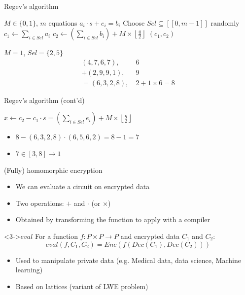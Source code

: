 \documentclass{beamer}
\providecommand{\floor}[1]{\left \lfloor #1 \right \rfloor }
\begin{document}
\begin{frame}{Regev's algorithm}
	\begin{algorithm}[H]
		\caption{Encryption}\label{algo:regev_enc}
		\begin{algorithmic}
			\Require $M\in\{0, 1\}$, $m$ equations $a_i \cdot s + e_i = b_i$
			\State Choose $Sel\subseteq[\![0, m-1]\!]$ randomly
			\State $c_1 \gets \displaystyle\sum_{i\in Sel} a_i$
			\State $c_2 \gets \left(\displaystyle\sum_{i\in Sel} b_i\right) + M \times \floor{\frac{q}{2}}$
			\State \Return $(c_1, c_2)$
		\end{algorithmic}
	\end{algorithm}
		$M = 1$, $Sel = \{2, 5\}$
		\begin{align*}
			(4, 7, 6, 7), &\ 6 \\
			+ (2, 9, 9, 1), &\ 9 \\
			= (6, 3, 2, 8), &\ 2 + 1 \times 6 = 8
		\end{align*}
\end{frame}

\begin{frame}{Regev's algorithm (cont'd)}
	\begin{algorithm}[H]
		\caption{Decryption}\label{algo:regev_dec}
		\begin{algorithmic}
			\State $x \gets c_2 - c_1 \cdot s = \left(\displaystyle\sum_{i\in Sel} e_i\right) + M\times\floor{\frac{q}{2}}$ %
			\If{$x\in \left[\floor{\frac{q}{4}}, \floor{\frac{3q}{4}} - 1\right]$}
				\State \Return 1
			\Else
				\State \Return 0
			\EndIf
		\end{algorithmic}
	\end{algorithm}
	\begin{itemize}
		\item $8 - (6, 3, 2, 8) \cdot (6, 5, 6, 2) = 8 - 1 = 7$
		\item $7 \in [3, 8] \rightarrow 1$
	\end{itemize}
\end{frame}

\begin{frame}{(Fully) homomorphic encryption}
	\begin{itemize}
		\item We can evaluate a circuit on encrypted data
		\item<2-> Two operations: $+$ and $\cdot$ (or $\times$)
		\item<2-> Obtained by transforming the function to apply with a compiler%
	\end{itemize}
	\begin{block}<3->{$eval$}
		For a function $f : P \times P \rightarrow P$ and encrypted data $C_1$ and $C_2$:
		\[eval(f, C_1, C_2) = Enc(f(Dec(C_1), Dec(C_2)))\]
	\end{block}
	\begin{itemize}
		\item<4-> Used to manipulate private data (e.g. Medical data, data science, Machine learning)
		\item<5-> Based on lattices (variant of LWE problem)
	\end{itemize}
\end{frame}
\end{document}
